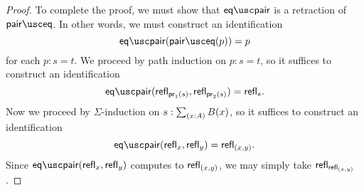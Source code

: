 \begin{proof}
To complete the proof, we must show that $\eqpair$ is a retraction of $\paireq$. In other words, we must construct an identification
\begin{equation*}
\eqpair(\paireq(p))=p
\end{equation*}
for each $p:s=t$. We proceed by path induction on $p:s=t$, so it suffices to construct an identification 
\begin{equation*}
\eqpair\pairr{\refl{\proj 1(s)},\refl{\proj 2(s)}}=\refl{s}.
\end{equation*}
Now we proceed by $\Sigma$-induction on $s:\sm{x:A}B(x)$, so it suffices to construct an identification
\begin{equation*}
\eqpair\pairr{\refl{x},\refl{y}}=\refl{(x,y)}.
\end{equation*}
Since $\eqpair\pairr{\refl{x},\refl{y}}$ computes to $\mathsf{refl}_{(x,y)}$, we may simply take $\mathsf{refl}_{\mathsf{refl}_{(x,y)}}$.
\end{proof}

